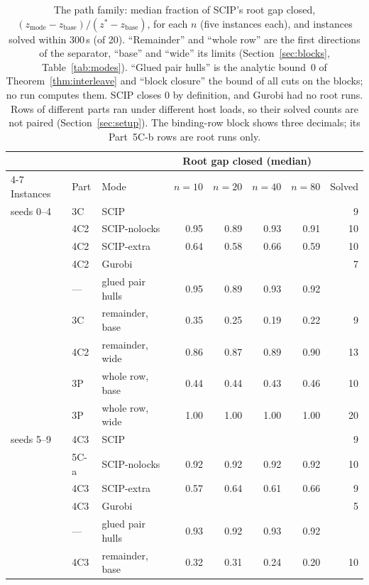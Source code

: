 \begin{table}[t]
\centering\footnotesize\setlength{\tabcolsep}{4pt}
\caption{The path family: median fraction of SCIP's root gap closed,
$(z_{\text{mode}}-z_{\text{base}})/(z^\ast-z_{\text{base}})$, for each $n$ (five
instances each), and instances solved within 300\,s (of 20). ``Remainder'' and
``whole row'' are the first directions of the separator, ``base'' and ``wide''
its limits (Section~\ref{sec:blocks}, Table~\ref{tab:modes}). ``Glued pair
hulls'' is the analytic bound~0 of Theorem~\ref{thm:interleave} and ``block
closure'' the bound of all cuts on the blocks; no run computes them. SCIP
closes 0 by definition, and Gurobi had no root runs. Rows of different parts
ran under different host loads, so their solved counts are not paired
(Section~\ref{sec:setup}). The binding-row block shows three decimals; its
Part~5C-b rows are root runs only.}\label{tab:mechanism}
\begin{tabular}{@{}lllrrrrr@{}}
\toprule
& & & \multicolumn{4}{c}{Root gap closed (median)} & \\
\cmidrule(lr){4-7}
Instances & Part & Mode & $n=10$ & $n=20$ & $n=40$ & $n=80$ & Solved\\
\midrule
seeds 0--4 & 3C & SCIP & & & & & 9\\
 & 4C2 & SCIP-nolocks & 0.95 & 0.89 & 0.93 & 0.91 & 10\\
 & 4C2 & SCIP-extra & 0.64 & 0.58 & 0.66 & 0.59 & 10\\
 & 4C2 & Gurobi & & & & & 7\\
 & --- & glued pair hulls & 0.95 & 0.89 & 0.93 & 0.92 & \\
 & 3C & remainder, base & 0.35 & 0.25 & 0.19 & 0.22 & 9\\
 & 4C2 & remainder, wide & 0.86 & 0.87 & 0.89 & 0.90 & 13\\
 & 3P & whole row, base & 0.44 & 0.44 & 0.43 & 0.46 & 10\\
 & 3P & whole row, wide & 1.00 & 1.00 & 1.00 & 1.00 & 20\\
\midrule
seeds 5--9 & 4C3 & SCIP & & & & & 9\\
 & 5C-a & SCIP-nolocks & 0.92 & 0.92 & 0.92 & 0.92 & 10\\
 & 4C3 & SCIP-extra & 0.57 & 0.64 & 0.61 & 0.66 & 9\\
 & 4C3 & Gurobi & & & & & 5\\
 & --- & glued pair hulls & 0.93 & 0.92 & 0.93 & 0.92 & \\
 & 4C3 & remainder, base & 0.32 & 0.31 & 0.24 & 0.20 & 10\\

\end{tabular}
\end{table}
